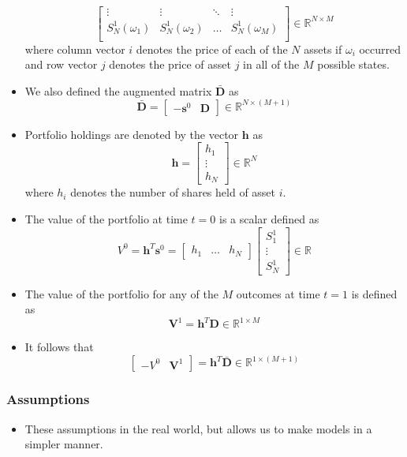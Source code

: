 \documentclass[11pt]{article}
\begin{document}
\begin{itemize}
\[\begin{bmatrix}
        \vdots & \vdots & \ddots & \vdots \\
        S_N^1(\omega_1) & S_N^1(\omega_2) & \hdots & S_N^1(\omega_M) \\
    \end{bmatrix} \in \mathbb{R}^{N \times M}
    \]
    where column vector $i$ denotes the price of each of the $N$ assets if $\omega_i$ occurred
    and row vector $j$ denotes the price of asset $j$ in all of the $M$ possible states.
    \item We also defined the augmented matrix $\bar{\boldsymbol{D}}$ as 
    \[
    \bar{\boldsymbol{D}} = \begin{bmatrix}
        -\boldsymbol{s}^0 & \boldsymbol{D} 
    \end{bmatrix} \in \mathbb{R}^{N \times (M + 1)}
    \] 
    \item Portfolio holdings are denoted by the vector $\boldsymbol{h}$ as 
    \[
    \boldsymbol{h} = \begin{bmatrix}
        h_1 \\
        \vdots \\
        h_N
    \end{bmatrix} \in \mathbb{R}^N
    \]
    where $h_i$ denotes the number of shares held of asset $i$.
    \item The value of the portfolio at time $t=0$ is a scalar defined as 
    \[
    V^0 = \boldsymbol{h}^T \boldsymbol{s}^0 = 
    \begin{bmatrix}
        h_1 & \hdots & h_N
    \end{bmatrix} 
    \begin{bmatrix}
        S_1^1 \\
        \vdots \\ 
        S_N^1
    \end{bmatrix} \in \mathbb{R}
    \]
    \item The value of the portfolio for any of the $M$ outcomes at time $t=1$ is defined as 
    \[
    \boldsymbol{V}^1 = \boldsymbol{h}^T \boldsymbol{D} \in \mathbb{R}^{1 \times M}
    \]
    \item It follows that
    \[
    \begin{bmatrix}
        -V^0 & \boldsymbol{V}^1
    \end{bmatrix} =
    \boldsymbol{h}^T \bar{\boldsymbol{D}} \in \mathbb{R}^{1 \times (M + 1)}
    \]
\end{itemize}

\subsubsection{Assumptions}
\begin{itemize}
    \item These assumptions in the real world, but allows us to make models in a simpler 
    manner.
\end{itemize}
\end{document}
